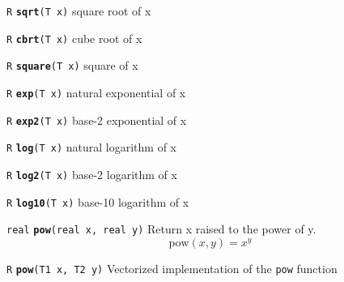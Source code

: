 \documentclass[
  10pt,
]{book}
\begin{document}

\texttt{R} \textbf{\texttt{sqrt}}\texttt{(T\ x)}\newline
square root of x


\texttt{R} \textbf{\texttt{cbrt}}\texttt{(T\ x)}\newline
cube root of x


\texttt{R} \textbf{\texttt{square}}\texttt{(T\ x)}\newline
square of x


\texttt{R} \textbf{\texttt{exp}}\texttt{(T\ x)}\newline
natural exponential of x


\texttt{R} \textbf{\texttt{exp2}}\texttt{(T\ x)}\newline
base-2 exponential of x


\texttt{R} \textbf{\texttt{log}}\texttt{(T\ x)}\newline
natural logarithm of x


\texttt{R} \textbf{\texttt{log2}}\texttt{(T\ x)}\newline
base-2 logarithm of x


\texttt{R} \textbf{\texttt{log10}}\texttt{(T\ x)}\newline
base-10 logarithm of x


\texttt{real} \textbf{\texttt{pow}}\texttt{(real\ x,\ real\ y)}\newline
Return x raised to the power of y. \[ \text{pow}(x,y) = x^y \]


\texttt{R} \textbf{\texttt{pow}}\texttt{(T1\ x,\ T2\ y)}\newline
Vectorized implementation of the \texttt{pow} function
\end{document}
